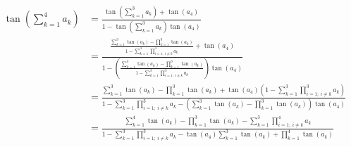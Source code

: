\documentclass[14pt]{article}
\begin{document}
\begin{enumerate}
        \begin{align*}
            \tan\left(\sum_{k=1}^4a_k\right) &=\frac{\tan\left(\sum_{k=1}^3a_k\right)+\tan(a_4)}{1-\tan\left(\sum_{k=1}^3a_k\right)\tan(a_4)}\\
                          &=\frac{
                                \frac{
                                    \sum_{k=1}^3\tan(a_k)-\prod_{k=1}^3\tan(a_k)
                                    }
                                    {
                                    1-\sum_{k=1}^3\prod_{i=1;\ i\neq k}^3a_k
                                    }
                                    +\tan(a_4)
                                }
                                {
                                1-\left(
                                    \frac
                                    {
                                    \sum_{k=1}^3\tan(a_k)-\prod_{k=1}^3\tan(a_k)
                                    }
                                    {
                                    1-\sum_{k=1}^3\prod_{i=1;\ i\neq k}^3a_k
                                    }\right)\tan(a_4)
                                }\\
                          &=\frac{
                            \sum_{k=1}^3\tan(a_k)-\prod_{k=1}^3\tan(a_k)+\tan(a_4)\left(1-\sum_{k=1}^3\prod_{i=1;\ i\neq k}^3a_k\right)
                          }
                          {
                            1-\sum_{k=1}^3\prod_{i=1;\ i\neq k}^3a_k-\left(\sum_{k=1}^3\tan(a_k)-\prod_{k=1}^3\tan(a_k)\right)\tan(a_4)
                          }\\
                          &=\frac{
                            \sum_{k=1}^4\tan(a_k)-\prod_{k=1}^3\tan(a_k)-\sum_{k=1}^3\prod_{i=1;\ i\neq k}^4a_k
                          }
                          {
                            1-\sum_{k=1}^3\prod_{i=1;\ i\neq k}^3a_k-\tan(a_4)\sum_{k=1}^3\tan(a_k)+\prod_{k=1}^4\tan(a_k)
                          }
        \end{align*}
    \end{enumerate}
\end{document}
